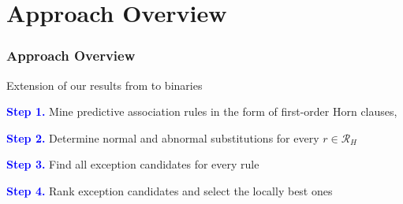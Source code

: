 \documentclass{beamer}
\newcommand{\makeoverview}{%
  \begin{frame}
    \frametitle{Outline}
    \tableofcontents
  \end{frame}
}
\newcommand{\bl}[1]{\textcolor{blue}{#1}}
\newcommand{\gr}[1]{\textcolor{darkgreen}{#1}}
\def\cG{\ensuremath{\mathcal{G}}}
\def\cR{\ensuremath{\mathcal{R}}}
\newcommand{\mi}[1]{\ensuremath{\mathit{#1}}}
\begin{document}




\section{Approach Overview}


\begin{frame}\frametitle{Approach Overview}

\bigskip
Extension of our results from \cite{techrep} \normalsize to binaries
\bigskip

\bl{ \textbf{Step 1.}} Mine predictive association rules in the form of first-order Horn clauses, \cite{amie}\bigskip
 \bigskip

\bl{\textbf{Step 2.}} Determine normal and abnormal substitutions for every $r\in \cR_H$ \bigskip
\bigskip

\bl{\textbf{Step 3.}} Find all exception candidates for every rule\bigskip
 \bigskip

\bl{\textbf{Step 4.}} Rank exception candidates and select the locally best ones
 \end{frame}

\end{document}

